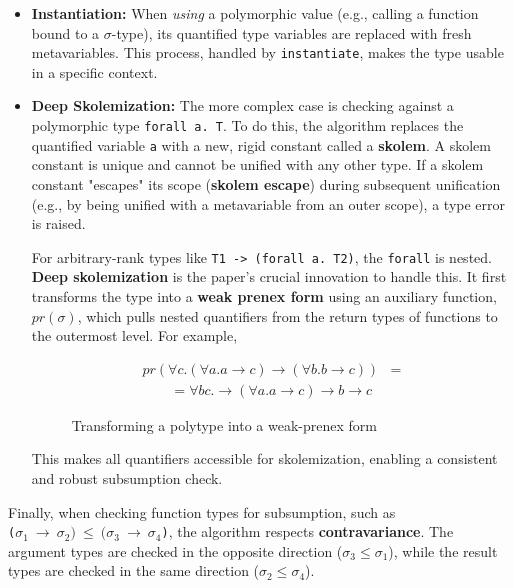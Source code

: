 \begin{itemize}
    \item \textbf{Instantiation:} When \textit{using} a polymorphic value (e.g., calling a function bound to a $\sigma$-type), its quantified type variables are replaced with fresh metavariables. This process, handled by \texttt{instantiate}, makes the type usable in a specific context.

    \item \textbf{Deep Skolemization:} The more complex case is checking against a polymorphic type \texttt{forall a. T}. To do this, the algorithm replaces the quantified variable \texttt{a} with a new, rigid constant called a \textbf{skolem}. A skolem constant is unique and cannot be unified with any other type. If a skolem constant "escapes" its scope (\textbf{skolem escape}) during subsequent unification (e.g., by being unified with a metavariable from an outer scope), a type error is raised.

          For arbitrary-rank types like \texttt{T1 -> (forall a. T2)}, the \texttt{forall} is nested. \textbf{Deep skolemization} is the paper's crucial innovation to handle this. It first transforms the type into a \textbf{weak prenex form} using an auxiliary function, $pr(\sigma)$, which pulls nested quantifiers from the return types of functions to the outermost level. For example,

          \begin{figure}
              \begin{equation*}
                  \begin{split}
                      pr(\forall c. (\forall a. a \rightarrow c) \rightarrow (\forall b. b \rightarrow c)) & = \\
                      \quad \quad =\forall b c. \rightarrow (\forall a. a \rightarrow c) \rightarrow b \rightarrow c
                  \end{split}
              \end{equation*}
              \caption{Transforming a polytype into a weak-prenex form}
          \end{figure}

          This makes all quantifiers accessible for skolemization, enabling a consistent and robust subsumption check.
\end{itemize}

Finally, when checking function types for subsumption, such as \\ \texttt{($\sigma_1~\rightarrow~\sigma_2)~\leq~(\sigma_3~\rightarrow~\sigma_4$)}, the algorithm respects \textbf{contravariance}. The argument types are checked in the opposite direction ($\sigma_3 \leq \sigma_1$), while the result types are checked in the same direction ($\sigma_2 \leq \sigma_4$).

